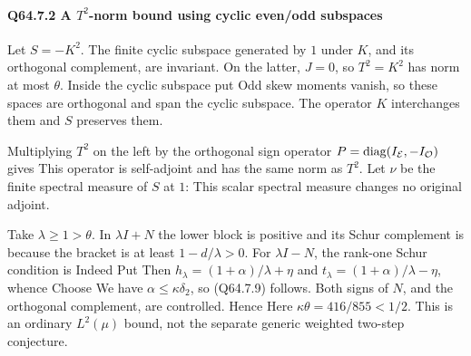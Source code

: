 \paragraph{Q64.7.2 A \(T^2\)-norm bound using cyclic even/odd subspaces}\label{part:Q64.7.2}

Let \(S=-K^2\). The finite cyclic subspace generated by \(1\) under
\(K\), and its orthogonal complement, are invariant. On the latter,
\(J=0\), so \(T^2=K^2\) has norm at most \(\theta\).
Inside the cyclic subspace put
Odd skew moments vanish, so these spaces are orthogonal and span
the cyclic subspace. The operator \(K\) interchanges them and
\(S\) preserves them.

Multiplying \(T^2\) on the left by the orthogonal sign operator
\(P=\operatorname{\operatorname{diag}}(I_{\cal E},\allowbreak -I_{\cal O})\) gives
This operator is self-adjoint and has the same norm as \(T^2\).
Let \(\nu\) be the finite spectral measure of \(S\) at \(1\):
This scalar spectral measure changes no original adjoint.

Take \(\lambda\ge1>\theta\). In \(\lambda I+N\) the lower block
is positive and its Schur complement is
because the bracket is at least \(1-d/\lambda>0\).
For \(\lambda I-N\), the rank-one Schur condition is
Indeed
Put
Then \(h_\lambda=(1+\alpha)/\lambda+\eta\) and
\(t_\lambda=(1+\alpha)/\lambda-\eta\), whence
Choose
We have \(\alpha\le\kappa \delta_2\), so (Q64.7.9) follows. Both signs of
\(N\), and the orthogonal complement, are controlled. Hence
Here \(\kappa\theta=416/855<1/2\).
This is an ordinary \(L^2(\mu)\) bound, not the separate generic
weighted two-step conjecture.

